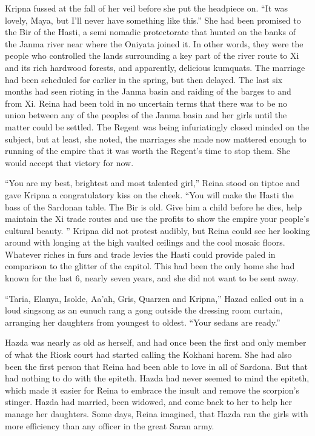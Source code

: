 \documentclass{article}
\begin{document}
	Kripna fussed at the fall of her veil before she put the headpiece on. “It was lovely, Maya, but I’ll never have something like this.” She had been promised to the Bir of the Hasti, a semi nomadic protectorate that hunted on the banks of the Janma river near where the Oniyata joined it. In other words, they were the people who controlled the lands surrounding a key part of the river route to Xi and its rich hardwood forests, and apparently, delicious kumquats. The marriage had been scheduled for earlier in the spring, but then delayed. The last six months had seen rioting in the Janma basin and raiding of the barges to and from Xi. Reina had been told in no uncertain terms that there was to be no union between any of the peoples of the Janma basin and her girls until the matter could be settled. The Regent was being infuriatingly closed minded on the subject, but at least, she noted, the marriages she made now mattered enough to running of the empire that it was worth the Regent’s time to stop them. She would accept that victory for now.
	
	“You are my best, brightest and most talented girl,” Reina stood on tiptoe and gave Kripna a congratulatory kiss on the cheek. “You will make the Hasti the bass of the Sardonan table. The Bir is old. Give him a child before he dies, help maintain the Xi trade routes and use the profits to show the empire your people’s cultural beauty. ”  Kripna did not protest audibly, but Reina could see her looking around with longing at the high vaulted ceilings and the cool mosaic floors. Whatever riches in furs and trade levies the Hasti could provide paled in comparison to the glitter of the capitol. This had been the only home she had known for the last 6, nearly seven years, and she did not want to be sent away.
	
	“Taria, Elanya, Isolde, Aa’ah, Gris, Quarzen and Kripna,” Hazad called out in a loud singsong as an eunuch rang a gong outside the dressing room curtain, arranging her daughters from youngest to oldest. “Your sedans are ready.” 
	
	Hazda was nearly as old as herself, and had once been the first and only member of what the Riosk court had started calling the Kokhani harem. She had also been the first person that Reina had been able to love in all of Sardona. But that had nothing to do with the epiteth. Hazda had never seemed to mind the epiteth, which made it easier for Reina to embrace the insult and remove the scorpion’s stinger. Hazda had married, been widowed, and come back to her to help her manage her daughters. Some days, Reina imagined, that Hazda ran the girls with more efficiency than any officer in the great Saran army.
	
\end{document}
